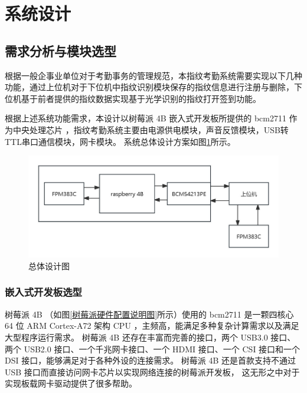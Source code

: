 \section{系统设计}

\subsection{需求分析与模块选型}

根据一般企事业单位对于考勤事务的管理规范，本指纹考勤系统需要实现以下几种功能，通过上位机对于下位机中指纹识别模块保存的指纹信息进行注册与删除，下位机基于前者提供的指纹数据实现基于光学识别的指纹打开签到功能。

根据上述系统功能需求，本设计以树莓派 4B 嵌入式开发板所提供的 bcm2711 作为中央处理芯片
，指纹考勤系统主要由电源供电模块，声音反馈模块，USB转TTL串口通信模块，网卡模块。
系统总体设计方案如图\ref{总体设计图}所示。

\begin{figure}[ht]
    \centering
    \includegraphics[width=\textwidth]{imgs/总体设计图.png}
    \caption{总体设计图}    \label{总体设计图}
\end{figure}

\subsubsection{嵌入式开发板选型}

树莓派 4B （如图\ref{树莓派硬件配置说明图}所示）使用的 bcm2711 是一颗四核心 64 位 ARM Cortex-A72 架构 CPU ，主频高，能满足多种复杂计算需求以及满足大型程序运行需求。
树莓派 4B 还存在丰富而完善的接口，两个 USB3.0 接口、两个 USB2.0 接口、一个千兆网卡接口、一个 HDMI 接口、一个 CSI 接口和一个 DSI 接口，能够满足对于各种外设的连接需求。
树莓派 4B 还是首款支持不通过 USB 接口而直接访问网卡芯片以实现网络连接的树莓派开发板，
这无形之中对于实现板载网卡驱动提供了很多帮助。

